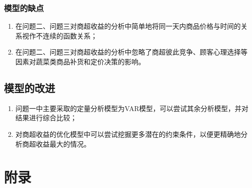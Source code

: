 \documentclass{my_paper}
\begin{document}
\subsubsection{模型的缺点}
\begin{enumerate}
    \item 在问题二、问题三对商超收益的分析中简单地将同一天内商品价格与时间的关系视作不连续的函数关系；
    \item 在问题二、问题三对商超收益的分析中忽略了商超彼此竞争、顾客心理选择等因素对蔬菜类商品补货和定价决策的影响。
\end{enumerate}

\subsection{模型的改进}
\begin{enumerate}
    \item 问题一中主要采取的定量分析模型为VAR模型，可以尝试其余分析模型，并对结果进行综合比较；
    \item 对商超收益的优化模型中可以尝试挖掘更多潜在的约束条件，以便更精确地分析商超收益最大的情况。
\end{enumerate}
\newpage
 
\begin{center}
 
\end{center}

\newpage
\section{附录}
\end{document}
